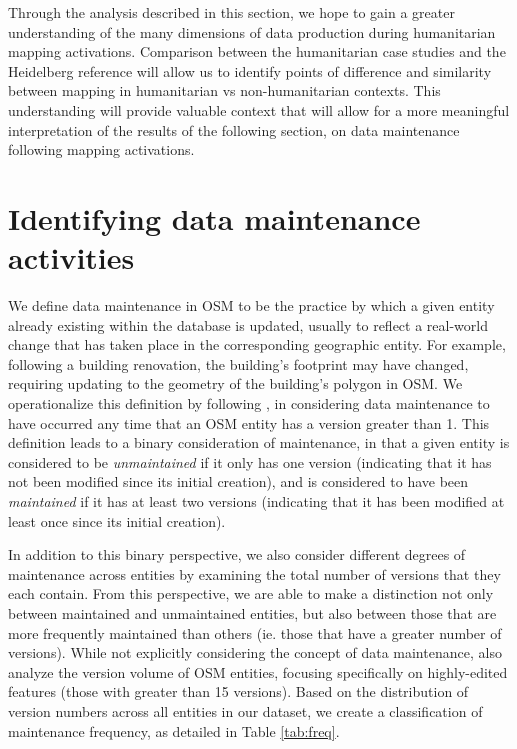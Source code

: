Through the analysis described in this section, we hope to gain a greater understanding of the many dimensions of data production during humanitarian mapping activations. Comparison between the humanitarian case studies and the Heidelberg reference will allow us to identify points of difference and similarity between mapping in humanitarian vs non-humanitarian contexts. This understanding will provide valuable context that will allow for a more meaningful interpretation of the results of the following section, on data maintenance following mapping activations.

\section{Identifying data maintenance activities}
\label{sec-maint}

We define data maintenance in OSM to be the practice by which a given entity already existing within the database is updated, usually to reflect a real-world change that has taken place in the corresponding geographic entity.  For example, following a building renovation, the building's footprint may have changed, requiring updating to the geometry of the building's polygon in OSM. 
We operationalize this definition by following \textcite{quattrone_work_2017}, in considering data maintenance to have occurred any time that an OSM entity has a version greater than 1. This definition leads to a binary consideration of maintenance, in that a given entity is considered to be \textit{unmaintained} if it only has one version (indicating that it has not been modified since its initial creation), and is considered to have been \textit{maintained} if it has at least two versions (indicating that it has been modified at least once since its initial creation).  

In addition to this binary perspective, we also consider different degrees of maintenance across entities by examining the total number of versions that they each contain. From this perspective, we are able to make a distinction not only between maintained and unmaintained entities, but also between those that are more frequently maintained than others (ie. those that have a greater number of versions). While not explicitly considering the concept of data maintenance, \textcite{mooney_characteristics_2012} also analyze the version volume of OSM entities, focusing specifically on highly-edited features (those with greater than 15 versions). Based on the distribution of version numbers across all entities in our dataset, we create a classification of maintenance frequency, as detailed in Table \ref{tab:freq}. 

